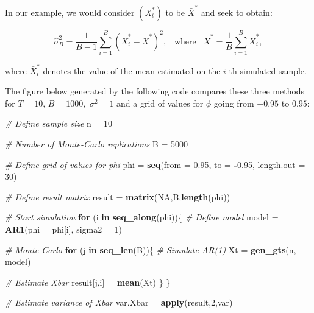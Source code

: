 \documentclass[]{book}
\newenvironment{Shaded}{\begin{snugshade}}{\end{snugshade}}
\newcommand{\KeywordTok}[1]{\textcolor[rgb]{0.13,0.29,0.53}{\textbf{#1}}}
\newcommand{\DataTypeTok}[1]{\textcolor[rgb]{0.13,0.29,0.53}{#1}}
\newcommand{\DecValTok}[1]{\textcolor[rgb]{0.00,0.00,0.81}{#1}}
\newcommand{\FloatTok}[1]{\textcolor[rgb]{0.00,0.00,0.81}{#1}}
\newcommand{\StringTok}[1]{\textcolor[rgb]{0.31,0.60,0.02}{#1}}
\newcommand{\CommentTok}[1]{\textcolor[rgb]{0.56,0.35,0.01}{\textit{#1}}}
\newcommand{\OtherTok}[1]{\textcolor[rgb]{0.56,0.35,0.01}{#1}}
\newcommand{\ControlFlowTok}[1]{\textcolor[rgb]{0.13,0.29,0.53}{\textbf{#1}}}
\newcommand{\OperatorTok}[1]{\textcolor[rgb]{0.81,0.36,0.00}{\textbf{#1}}}
\newcommand{\NormalTok}[1]{#1}
\theoremstyle{definition}
\theoremstyle{definition}
\theoremstyle{definition}
\theoremstyle{remark}
\begin{document}
In our example, we would consider \((X_t^*)\) to be \({\bar{X}^*}\) and
seek to obtain:

\[\hat{\sigma}^2_B = \frac{1}{B-1} \sum_{i = 1}^B \left(\bar{X}^*_i - \bar{X}^* \right)^2, \;\;\; \text{where} \;\;\; \bar{X}^* = \frac{1}{B} \sum_{i=1}^B \bar{X}^*_i,\]

where \(\bar{X}^*_i\) denotes the value of the mean estimated on the
\(i\)-th simulated sample.

The figure below generated by the following code compares these three
methods for \(T = 10\), \(B = 1000,\) \(\sigma^2 = 1\) and a grid of
values for \(\phi\) going from \(-0.95\) to \(0.95\):

\begin{Shaded}
\begin{Highlighting}[]
\CommentTok{# Define sample size}
\NormalTok{n =}\StringTok{ }\DecValTok{10}

\CommentTok{# Number of Monte-Carlo replications}
\NormalTok{B =}\StringTok{ }\DecValTok{5000}

\CommentTok{# Define grid of values for phi}
\NormalTok{phi =}\StringTok{ }\KeywordTok{seq}\NormalTok{(}\DataTypeTok{from =} \FloatTok{0.95}\NormalTok{, }\DataTypeTok{to =} \OperatorTok{-}\FloatTok{0.95}\NormalTok{, }\DataTypeTok{length.out =} \DecValTok{30}\NormalTok{)}

\CommentTok{# Define result matrix}
\NormalTok{result =}\StringTok{ }\KeywordTok{matrix}\NormalTok{(}\OtherTok{NA}\NormalTok{,B,}\KeywordTok{length}\NormalTok{(phi))}

\CommentTok{# Start simulation}
\ControlFlowTok{for}\NormalTok{ (i }\ControlFlowTok{in} \KeywordTok{seq_along}\NormalTok{(phi))\{}
  \CommentTok{# Define model}
\NormalTok{  model =}\StringTok{ }\KeywordTok{AR1}\NormalTok{(}\DataTypeTok{phi =}\NormalTok{ phi[i], }\DataTypeTok{sigma2 =} \DecValTok{1}\NormalTok{)}
  
  \CommentTok{# Monte-Carlo}
  \ControlFlowTok{for}\NormalTok{ (j }\ControlFlowTok{in} \KeywordTok{seq_len}\NormalTok{(B))\{}
    \CommentTok{# Simulate AR(1)}
\NormalTok{    Xt =}\StringTok{ }\KeywordTok{gen_gts}\NormalTok{(n, model)}
    
    \CommentTok{# Estimate Xbar}
\NormalTok{    result[j,i] =}\StringTok{ }\KeywordTok{mean}\NormalTok{(Xt)}
\NormalTok{  \}}
\NormalTok{\}}

\CommentTok{# Estimate variance of Xbar}
\NormalTok{var.Xbar =}\StringTok{ }\KeywordTok{apply}\NormalTok{(result,}\DecValTok{2}\NormalTok{,var)}


\end{Highlighting}
\end{Shaded}
\end{document}
